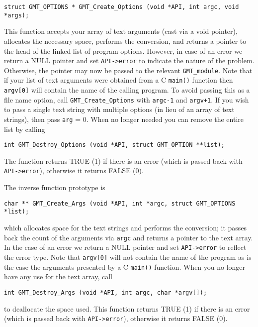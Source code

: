 \documentclass[11pt]{report}
\begin{document}
\begin{verbatim}
struct GMT_OPTIONS * GMT_Create_Options (void *API, int argc, void *args);
\end{verbatim}
This function accepts your array of text arguments (cast via a void pointer), allocates the necessary
space, performs the conversion, and returns a pointer to the
head of the linked list of program options.  However, in case of an error
we return a NULL pointer and set \texttt{API->error} to indicate the nature of the problem.
Otherwise, the pointer may now be passed to the
relevant \texttt{GMT\_module}.  Note that if your list of text arguments
were obtained from a C \texttt{main()} function then \texttt{argv[0]} will
contain the name of the calling program.  To avoid passing this as a file
name option, call \texttt{GMT\_Create\_Options} with \texttt{argc-1}
and \texttt{argv+1}.  If you wish to pass a single text string with
multiple options (in lieu of an array of text strings), then pass \texttt{arg} = 0.
When no longer needed you can remove the entire list by calling
\begin{verbatim}
int GMT_Destroy_Options (void *API, struct GMT_OPTION **list);
\end{verbatim}
The function returns TRUE (1) if there is an error (which is passed back with \texttt{API->error}),
otherwise it returns FALSE (0).

The inverse function prototype is
\begin{verbatim}
char ** GMT_Create_Args (void *API, int *argc, struct GMT_OPTIONS *list);
\end{verbatim}
which allocates space for the text strings and performs the conversion;
it passes back the count of the arguments via \texttt{argc} and returns a pointer to the text array.
In the case of an error we return a NULL pointer and set \texttt{API->error} to reflect the error type.
Note that \texttt{argv[0]} will not contain the name of the program as
is the case the arguments presented by a C \texttt{main()} function.
When you no longer have any use for the text array, call
\begin{verbatim}
int GMT_Destroy_Args (void *API, int argc, char *argv[]);
\end{verbatim}
to deallocate the space used.  This function returns TRUE (1) if there is an error
(which is passed back with \texttt{API->error}),
otherwise it returns FALSE (0).
\end{document}
